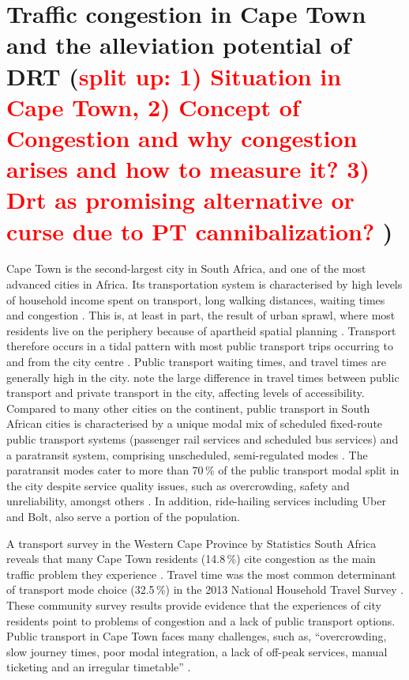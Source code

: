 \documentclass[main.tex]{subfiles}
\begin{document}
\section*{Traffic congestion in Cape Town and the alleviation
potential of DRT (\textcolor{red}{split up: 1) Situation in Cape Town, 2) Concept of Congestion and why congestion arises and how to measure it? 3) Drt as promising alternative or curse due to PT cannibalization? })}


Cape Town is the second-largest city in South Africa, and one of the most advanced cities in Africa. Its transportation system is characterised by high levels of household income spent on transport, long walking distances, waiting times and congestion \citep{StateofCT, jennings2015finding}. This is, at least in part, the result of urban sprawl, where most residents live on the periphery \citep{Turok2011, jennings2015finding} because of apartheid spatial planning \citep{Liphoto2025}. Transport therefore occurs in a tidal pattern with most public transport trips occurring to and from the city centre \citep{Turok2011, jennings2015finding}. Public transport waiting times, and travel times are generally high in the city. \citealp{hitge2015comparison} note the large difference in travel times between public transport and private transport in the city, affecting levels of accessibility. Compared to many other cities on the continent, public transport in South African cities is characterised by a unique modal mix of scheduled fixed-route public transport systems (passenger rail services and scheduled bus services) and a paratransit system, comprising unscheduled, semi-regulated modes \citep{Ryseck2024}. The paratransit modes cater to more than 70\,\% of the public transport modal split in the city despite service quality issues, such as overcrowding, safety and unreliability, amongst others \citep{Ferro2024}. In addition, ride-hailing services including Uber and Bolt, also serve a portion of the population. 

A transport survey in the Western Cape Province by Statistics South Africa reveals that many Cape Town residents (14.8\,\%) cite congestion as the main traffic problem  they experience \citep{StatsSAreport}. Travel time was the most common determinant of transport mode choice (32.5\,\%) in the 2013 National Household Travel Survey \citep{StatsSA14}. These community survey results provide evidence that the experiences of city residents point to problems of congestion and a lack of public transport options. Public transport in Cape Town faces many challenges, such as, “overcrowding, slow journey times, poor modal integration, a lack of off-peak services, manual ticketing and an irregular timetable” \citep{TDCIP}.
\end{document}
